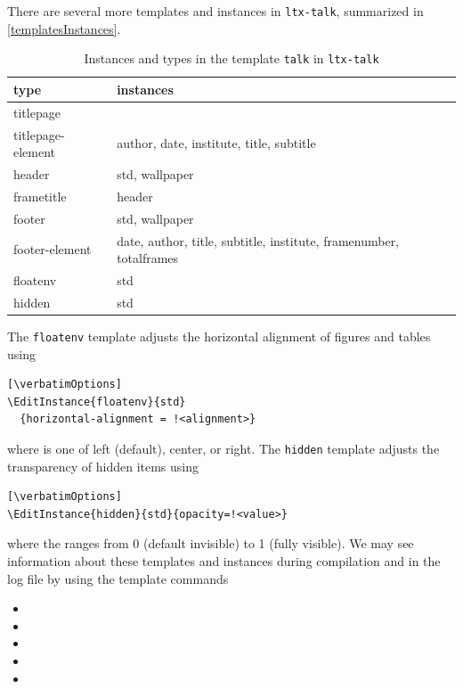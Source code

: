 \documentclass{ltugboat}
\newcommand{\verbatimOptions}{%
 \IfDocumentMetadataT{setup-code=}\small\makevmeta}
\newcommand{\ltxtalk}{\texttt{ltx-talk}}
\begin{document}
There are several more templates and instances in \ltxtalk,
summarized in \autoref{templatesInstances}.
\begin{table}
\caption{Instances and types in the template \texttt{talk} in \ltxtalk}
\label{templatesInstances}
\centering
\begin{tabularx}{\linewidth}{l >{\raggedright} X}\toprule
type & instances \\\midrule
titlepage & \\
titlepage-element & author, date, institute, title, subtitle\\
header & std, wallpaper \\
frametitle & header \\
footer & std, wallpaper \\
footer-element
& date, author, title, subtitle, institute, framenumber, totalframes \\
floatenv & std\\
hidden & std \\
\bottomrule
\end{tabularx}
\end{table}
The \texttt{floatenv} template adjusts the horizontal alignment
of figures and tables using
\begin{verbatim}[\verbatimOptions]
\EditInstance{floatenv}{std}
  {horizontal-alignment = !<alignment>}
\end{verbatim}
where  is one of left (default), center, or right.
The \texttt{hidden} template adjusts the transparency of hidden items using
\begin{verbatim}[\verbatimOptions]
\EditInstance{hidden}{std}{opacity=!<value>}
\end{verbatim}
where the  ranges from 0 (default invisible) to 1 (fully visible).
We may see information about these templates and instances during compilation
and in the log file by using the template commands
\begin{itemize}
\item{}
\item{}
\item{}
\item{}
\item{}
\end{itemize}
\end{document}
